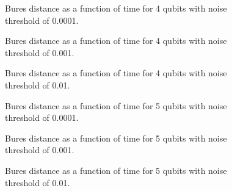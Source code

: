 \pagebreak

\begin{figure}[h]
\begin{center}
\end{center}
\caption{Bures distance as a function of time for 4 qubits with noise
threshold of 0.0001. }
\end{figure}

\pagebreak

\begin{figure}[h]
\begin{center}
\end{center}
\caption{Bures distance as a function of time for 4 qubits with noise
threshold of 0.001. }
\end{figure}

\pagebreak

\begin{figure}[h]
\begin{center}
\end{center}
\caption{Bures distance as a function of time for 4 qubits with noise
threshold of 0.01. }
\end{figure}

\pagebreak

\begin{figure}[h]
\begin{center}
\end{center}
\caption{Bures distance as a function of time for 5 qubits with noise
threshold of 0.0001. }
\end{figure}

\pagebreak

\begin{figure}[h]
\begin{center}
\end{center}
\caption{Bures distance as a function of time for 5 qubits with noise
threshold of 0.001.}
\end{figure}

\pagebreak

\begin{figure}[h]
\begin{center}
\end{center}
\caption{Bures distance as a function of time for 5 qubits with noise
threshold of 0.01.}
\end{figure}

